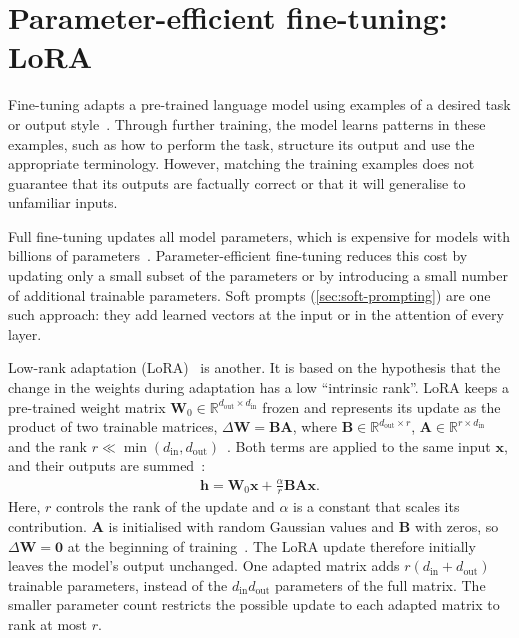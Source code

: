 \section{Parameter-efficient fine-tuning: LoRA}
\label{sec:lora}

Fine-tuning adapts a pre-trained language model using examples of a desired task or output style~\cite{hu2022lora}. Through further training, the model learns patterns in these examples, such as how to perform the task, structure its output and use the appropriate terminology. However, matching the training examples does not guarantee that its outputs are factually correct or that it will generalise to unfamiliar inputs.

Full fine-tuning updates all model parameters, which is expensive for models with billions of parameters~\cite{hu2022lora}. Parameter-efficient fine-tuning reduces this cost by updating only a small subset of the parameters or by introducing a small number of additional trainable parameters. Soft prompts (\autoref{sec:soft-prompting}) are one such approach: they add learned vectors at the input or in the attention of every layer.

Low-rank adaptation (LoRA)~\cite{hu2022lora} is another. It is based on the hypothesis that the change in the weights during adaptation has a low ``intrinsic rank''. LoRA keeps a pre-trained weight matrix $\mathbf{W}_0 \in \mathbb{R}^{d_{\text{out}} \times d_{\text{in}}}$ frozen and represents its update as the product of two trainable matrices, $\Delta\mathbf{W} = \mathbf{B}\mathbf{A}$, where $\mathbf{B} \in \mathbb{R}^{d_{\text{out}} \times r}$, $\mathbf{A} \in \mathbb{R}^{r \times d_{\text{in}}}$ and the rank $r \ll \min(d_{\text{in}}, d_{\text{out}})$~\cite{hu2022lora}. Both terms are applied to the same input $\mathbf{x}$, and their outputs are summed~\cite{hu2022lora}:
\begin{align}
  \mathbf{h} = \mathbf{W}_0 \mathbf{x} + \frac{\alpha}{r} \mathbf{B}\mathbf{A} \mathbf{x}.
  \label{eq:lora}
\end{align}
Here, $r$ controls the rank of the update and $\alpha$ is a constant that scales its contribution. $\mathbf{A}$ is initialised with random Gaussian values and $\mathbf{B}$ with zeros, so $\Delta\mathbf{W} = \mathbf{0}$ at the beginning of training~\cite{hu2022lora}. The LoRA update therefore initially leaves the model's output unchanged. One adapted matrix adds $r(d_{\text{in}} + d_{\text{out}})$ trainable parameters, instead of the $d_{\text{in}} d_{\text{out}}$ parameters of the full matrix. The smaller parameter count restricts the possible update to each adapted matrix to rank at most $r$.

